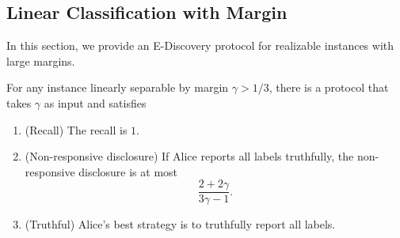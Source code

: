 \subsection{Linear Classification with Margin}

In this section, we provide an E-Discovery protocol for realizable instances with large margins. 

\begin{theorem}\label{thm:protocol_realizable}
    For any instance linearly separable by margin $\gamma > 1/3$, there is a protocol that takes $\gamma$ as input and satisfies
    \begin{enumerate}
        \item (Recall) The recall is $1$.
        \item (Non-responsive disclosure) If Alice reports all labels truthfully, the non-responsive disclosure is at most 
        $$
        \frac{2+2\gamma}{3\gamma -1}.
        $$
        \item (Truthful) Alice's best strategy is to truthfully report all labels. 
    \end{enumerate}
\end{theorem}




